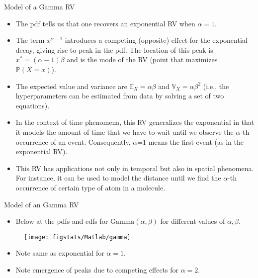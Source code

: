 \documentclass[9pt]{beamer}
\begin{document}
%
\begin{frame}{Model of a Gamma RV}

\begin{itemize}
\item The pdf tells us that one recovers an exponential RV when $\alpha=1$. 
\item The term $x^{\alpha-1}$ introduces a competing (opposite) effect for the exponential decay, giving rise to peak in the pdf. The location of this peak is $x^*=(\alpha-1)\beta$ and is the mode of the RV (point that maximizes $\mathbb{P}(X=x)$). 
\item The expected value and variance are $\mathbb{E}_X=\alpha\beta$ and $\mathbb{V}_X=\alpha\beta^2$ (i.e., the hyperparameters can be estimated from data by solving a set of two equations). 
\item In the context of time phenomena, this RV generalizes the exponential in that it models the amount of time that we have to wait until we observe the $\alpha$-th occurrence of an event. Consequently, $\alpha$=1 means the first event (as in the exponential RV). 
\item This RV has applications not only in temporal but also in spatial phenomena. For instance, it can be used to model the distance until we find the $\alpha$-th occurrence of certain type of atom in a molecule.  
\end{itemize}

\end{frame}


%
\begin{frame}{Model of an Gamma RV}
\begin{itemize}
\item Below at the pdfs and cdfs for $\textrm{Gamma}(\alpha,\beta)$ for different values of $\alpha,\beta$.
\end{itemize}
\begin{figure}[!htb]
    \centering
	\texttt{[image: figstats/Matlab/gamma]}
\end{figure}
\begin{itemize}
\item Note same as exponential for $\alpha=1$.
\item Note emergence of peaks due to competing effects for $\alpha=2$. 
\end{itemize}
\end{frame}
\end{document}
